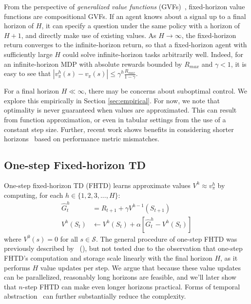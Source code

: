 \documentclass[letterpaper]{article} %
\newcommand{\citei}[1]{\citeauthor{#1} (\citeyear{#1})}
\begin{document}
From the perspective of \textit{generalized value functions} (GVFs)~\cite{horde2011}, fixed-horizon value functions are compositional GVFs. %
If an agent knows about a signal up to a final horizon of $H$, it can specify a question under the same policy with a horizon of $H + 1$, and directly make use of existing values.
As $H \to \infty$, the fixed-horizon return converges to the infinite-horizon return, so that a fixed-horizon agent with sufficiently large $H$ could solve infinite-horizon tasks arbitrarily well. Indeed, for an infinite-horizon MDP with absolute rewards bounded by $R_{max}$ and $\gamma < 1$, it is easy to see that $|v_\pi^h(s) - v_\pi(s)| \leq \gamma^h\frac{R_{max}}{1-\gamma}$.

For a final horizon $H \ll \infty$, there may be concerns about suboptimal control. We explore this empirically in Section \ref{sec:empirical}. For now, we note that optimality is never guaranteed when values are approximated. This can result from function approximation, or even in tabular settings from the use of a constant step size. Further, recent work shows benefits in considering shorter horizons~\cite{lowergamma2019} based on performance metric mismatches.

\subsection{One-step Fixed-horizon TD}

One-step fixed-horizon TD (FHTD) learns approximate values $V^h \approx v^h_\pi$ by computing, for each $h \in \{1, 2, 3, ..., H\}$:
\begin{align}
\hat{G}^h_t &= R_{t+1} + \gamma V^{h-1}(S_{t+1})
\label{eqn:onestepfhtdtarget} \\
V^h(S_t) &\leftarrow V^h(S_t) + \alpha [\hat{G}^h_t - V^h(S_t)]
\label{eqn:onestepfhtdupdate}
\end{align}
where $V^0(s) = 0$ for all $s \in \mathcal{S}$.
The general procedure of one-step FHTD was previously described by~\citei{sutton1988}, but not tested due to the observation that one-step FHTD's computation and storage scale linearly with the final horizon $H$, as it performs $H$ value updates per step. We argue that because these value updates can be parallelized, reasonably long horizons are feasible, and we'll later show that $n$-step FHTD can make even longer horizons practical. Forms of temporal abstraction~\cite{options1999} can further substantially reduce the complexity.
\end{document}
